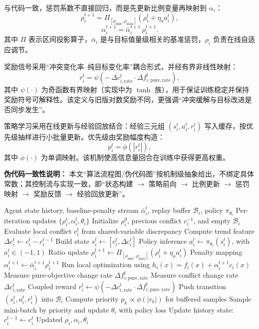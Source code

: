 \documentclass[12pt]{ctexart}
\begin{document}
与代码一致，惩罚系数不直接回归，而是先更新比例变量再映射到 \(\alpha_i\)：
\[
\rho_i^{t+1}=\Pi_{[\rho_{\min},\rho_{\max}]}\!\left(\rho_i^t+\eta_a a_i^t\right),
\]
\[
\alpha_i^{t+1}=\bar{\alpha}_i^{t+1}\,\rho_i^{t+1}.
\]
其中 \(\Pi\) 表示区间投影算子，\(\bar{\alpha}_i\) 是与目标值量级相关的基准惩罚，\(\rho_i\) 负责在线自适应调节。

奖励信号采用“冲突变化率--纯目标变化率”耦合形式，并经有界非线性映射：
\[
r_i^t=\psi\!\left(-\,\Delta c_{i,\mathrm{rate}}^t\cdot \Delta f_{i,\mathrm{pure,rate}}^t\right),
\]
其中 \(\psi(\cdot)\) 为奇函数有界映射（实现中为 \(\tanh\) 族），用于保证训练稳定并保持奖励符号可解释性。该定义与旧版对数奖励不同，更强调“冲突缓解与目标改进是否同步发生”。

策略学习采用在线更新与经验回放结合：经验三元组 \((s_i^t,a_i^t,r_i^t)\) 写入缓存，按优先级抽样进行小批量更新。优先级由奖励幅度构造：
\[
p_i^t=\phi\!\left(|r_i^t|\right),
\]
其中 \(\phi(\cdot)\) 为单调映射。该机制使高信息量回合在训练中获得更高权重。

\textbf{伪代码一致性说明：} 本文“算法流程图/伪代码图”按机制级抽象给出，不绑定具体常数；其控制流与实现一致，即“状态构建 \(\rightarrow\) 策略前向 \(\rightarrow\) 比例更新 \(\rightarrow\) 惩罚映射 \(\rightarrow\) 奖励反馈 \(\rightarrow\) 经验回放更新”。

\begin{algorithm}[htbp]
\caption{RL-Based Adaptive Penalty Update (Abstract)}
\label{alg:rl_penalty_update}
\begin{algorithmic}[1]
\Require Agent state history, baseline-penalty stream \(\bar{\alpha}_i^t\), replay buffer \(\mathcal{B}_i\), policy \(\pi_{\theta_i}\)
\Ensure Per-iteration updates \(\{\rho_i^t,\alpha_i^t,\theta_i\}\)
\State Initialize \(\rho_i^0\), previous conflict \(c_i^{-1}\), and empty \(\mathcal{B}_i\)
  \State Evaluate local conflict \(c_i^t\) from shared-variable discrepancy
  \State Compute trend feature \(\Delta c_i^t \gets c_i^t-c_i^{t-1}\)
  \State Build state \(s_i^t \gets [c_i^t,\Delta c_i^t]\)
  \State Policy inference \(a_i^t \gets \pi_{\theta_i}(s_i^t)\), with \(a_i^t\in(-1,1)\)
  \State Ratio update \(\rho_i^{t+1}\gets \Pi_{[\rho_{\min},\rho_{\max}]}\!\left(\rho_i^t+\eta_a a_i^t\right)\)
  \State Penalty mapping \(\alpha_i^{t+1}\gets \bar{\alpha}_i^{t+1}\rho_i^{t+1}\)
  \State Run local optimization using \(h_i(x)=f_i(x)+\alpha_i^{t+1}c_i(x)\)
  \State Measure pure-objective change rate \(\Delta f_{i,\mathrm{pure,rate}}^t\)
  \State Measure conflict change rate \(\Delta c_{i,\mathrm{rate}}^t\)
  \State Coupled reward \(r_i^t\gets \psi\!\left(-\Delta c_{i,\mathrm{rate}}^t\cdot \Delta f_{i,\mathrm{pure,rate}}^t\right)\)
  \State Push transition \((s_i^t,a_i^t,r_i^t)\) into \(\mathcal{B}_i\)
    \State Compute priority \(p_k\propto \phi(|r_k|)\) for buffered samples
    \State Sample mini-batch by priority and update \(\theta_i\) with policy loss
  \EndIf
  \State Update history state: \(c_i^{t-1}\gets c_i^t\)
\EndFor
\State \Return Updated \(\rho_i,\alpha_i,\theta_i\)
\end{algorithmic}
\end{algorithm}
\end{document}
